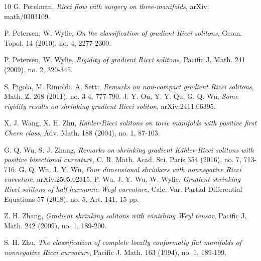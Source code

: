 \documentclass[12pt]{amsart}
\begin{document}
\begin{thebibliography}{10}
		G. Perelman,  {\em Ricci flow with surgery on three-manifolds}, arXiv: math/0303109.
		
 	
		
		P. Petersen, W. Wylie, {\em On the classification of gradient Ricci solitons}, Geom. Topol. 14 (2010), no. 4, 2277-2300.
		
		P. Petersen, W. Wylie, {\em Rigidity of gradient Ricci solitons}, Pacific J. Math. 241 (2009), no. 2, 329-345.
		
		S. Pigola, M. Rimoldi, A. Setti,   {\em Remarks on non-compact gradient Ricci solitons}, Math. Z. 268 (2011), no. 3-4, 777-790.
		J. Y. Ou, Y. Y. Qu, G. Q. Wu, {\em Some rigidity results on shrinking gradient Ricci soliton}, arXiv:2411.06395.
		
		X. J. Wang, X. H. Zhu, {\em K\"ahler-Ricci solitons on toric manifolds with positive first Chern class}, Adv. Math. 188 (2004), no. 1, 87-103.
		
		G. Q. Wu, S. J. Zhang, {\em Remarks on shrinking gradient K\"ahler-Ricci solitons with positive bisectional curvature}, C. R. Math. Acad. Sci. Paris 354 (2016), no. 7, 713-716.
		G. Q. Wu, J. Y. Wu, {\em Four dimensional shrinkers with nonnegative Ricci curvature}, arXiv:2505.02315.
		P. Wu, J. Y. Wu, W. Wylie, {\em Gradient shrinking Ricci solitons of half harmonic Weyl curvature}, Calc. Var. Partial Differential Equations 57 (2018), no. 5, Art. 141, 15 pp.
		
		Z. H. Zhang, {\em Gradient shrinking solitons with vanishing Weyl tensor}, Pacific J. Math. 242 (2009), no. 1, 189-200.
		
		S. H. Zhu, {\em The classification of complete locally conformally flat manifolds of nonnegative Ricci curvature}, Pacific J. Math. 163 (1994), no. 1, 189-199.
	\end{thebibliography}
	
	
	
	
	
\end{document}
